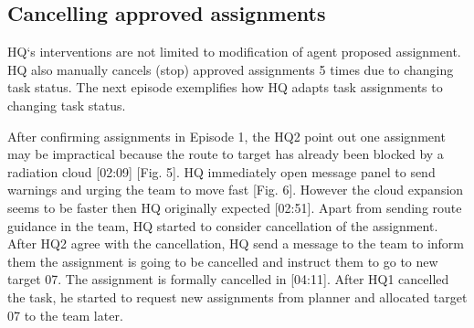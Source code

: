 \subsection{Cancelling approved assignments}
HQ`s interventions are not limited to modification of agent proposed assignment. HQ also manually cancels (stop) approved assignments 5 times due to changing task status.  The next episode exemplifies how HQ adapts task assignments to changing task status. \\


\noindent{} 
\hfill \break


After confirming assignments in Episode 1, the HQ2 point out one assignment may be impractical because the route to target has already been blocked by a radiation cloud [02:09] [Fig. 5]. HQ immediately open message panel to send warnings and urging the team to move fast [Fig. 6]. However the cloud expansion seems to be faster then HQ originally expected [02:51]. Apart from sending route guidance in the team, HQ started to consider cancellation of the assignment. After HQ2 agree with the cancellation, HQ send a message to the team to inform them the assignment is going to be cancelled and instruct them to go to new target 07. The assignment is formally cancelled in [04:11]. After HQ1 cancelled the task, he started to request new assignments from planner and allocated target 07 to the team later. \\


